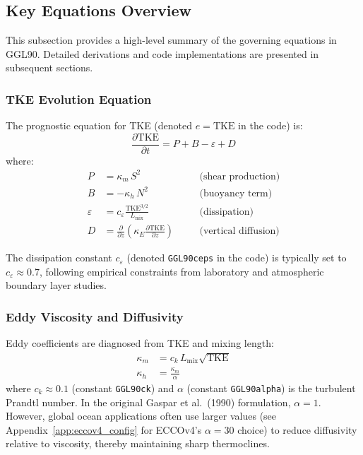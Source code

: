 \documentclass[12pt,letterpaper]{article}
\newcommand{\TKE}{\mathrm{TKE}}
\newcommand{\KM}{\kappa_m}
\newcommand{\KH}{\kappa_h}
\newcommand{\KE}{\kappa_E}
\newcommand{\Lmix}{L_{\mathrm{mix}}}
\begin{document}
\subsection{Key Equations Overview}

This subsection provides a high-level summary of the governing equations in
GGL90. Detailed derivations and code implementations are presented in
subsequent sections.

\subsubsection{TKE Evolution Equation}

The prognostic equation for TKE (denoted $e = \TKE$ in the code) is:
\begin{equation}
\frac{\partial \TKE}{\partial t} = P + B - \varepsilon + D
\label{eq:tke_budget}
\end{equation}
where:
\begin{align*}
P &= \KM \, S^2 \quad &&\text{(shear production)} \\
B &= -\KH \, N^2 \quad &&\text{(buoyancy term)} \\
\varepsilon &= c_\varepsilon \frac{\TKE^{3/2}}{\Lmix} \quad &&\text{(dissipation)} \\
D &= \frac{\partial}{\partial z} \left( \KE \frac{\partial \TKE}{\partial z} \right) \quad &&\text{(vertical diffusion)}
\end{align*}

The dissipation constant $c_\varepsilon$ (denoted \texttt{GGL90ceps} in the
code) is typically set to $c_\varepsilon \approx 0.7$, following empirical
constraints from laboratory and atmospheric boundary layer studies.

\subsubsection{Eddy Viscosity and Diffusivity}

Eddy coefficients are diagnosed from TKE and mixing length:
\begin{align}
\KM &= c_k \, \Lmix \sqrt{\TKE} \label{eq:kappa_m} \\
\KH &= \frac{\KM}{\alpha} \label{eq:kappa_h}
\end{align}
where $c_k \approx 0.1$ (constant \texttt{GGL90ck}) and $\alpha$ (constant
\texttt{GGL90alpha}) is the turbulent Prandtl number. In the original Gaspar
et al.\ (1990) formulation, $\alpha = 1$. However, global ocean applications
often use larger values (see Appendix~\ref{app:eccov4_config} for ECCOv4's
$\alpha = 30$ choice) to reduce diffusivity relative to viscosity, thereby
maintaining sharp thermoclines.
\end{document}

